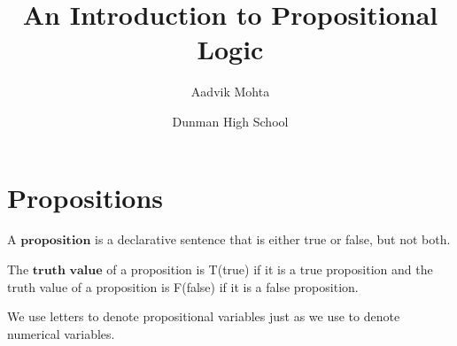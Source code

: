\documentclass{article}
\title{An Introduction to Propositional Logic}
\author{Aadvik Mohta}
\date{Dunman High School}
\newtheorem{definition}{Definition}[subsection]
\newtheorem{remark}{Remark}[subsection]
\begin{document}
\maketitle

\section{Propositions}
\begin{tcolorbox}
[colback=blue!5!white,colframe=blue!75!black,title=\begin{definition}
\end{definition}]
 A $\textbf{proposition}$ is a declarative sentence that is either true or false, but not both.
\end{tcolorbox}
\begin{tcolorbox}
[colback=cyan!5!white,colframe=cyan!75!black,title=\begin{remark}  
\end{remark}]
 The $\textbf{truth value}$ of a proposition is T(true) if it is a true proposition and the truth value of a proposition is F(false) if it is a false proposition.
\end{tcolorbox}
\begin{tcolorbox}
[colback=cyan!5!white,colframe=cyan!75!black,title=\begin{remark}
\end{remark}]
We use letters to denote propositional variables just as we use to denote numerical variables.
\end{tcolorbox}
\end{document}
